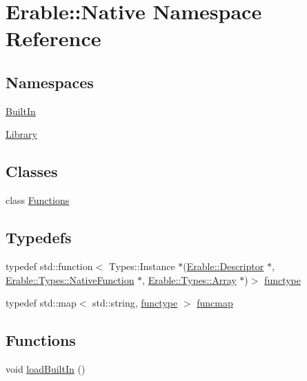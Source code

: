 \hypertarget{namespace_erable_1_1_native}{}\section{Erable\+::Native Namespace Reference}
\label{namespace_erable_1_1_native}
\subsection*{Namespaces}
\begin{DoxyCompactItemize}
\item 
 \mbox{\hyperlink{namespace_erable_1_1_native_1_1_built_in}{Built\+In}}
\item 
 \mbox{\hyperlink{namespace_erable_1_1_native_1_1_library}{Library}}
\end{DoxyCompactItemize}
\subsection*{Classes}
\begin{DoxyCompactItemize}
\item 
class \mbox{\hyperlink{class_erable_1_1_native_1_1_functions}{Functions}}
\end{DoxyCompactItemize}
\subsection*{Typedefs}
\begin{DoxyCompactItemize}
\item 
typedef std\+::function$<$ Types\+::\+Instance $\ast$(\mbox{\hyperlink{class_erable_1_1_descriptor}{Erable\+::\+Descriptor}} $\ast$, \mbox{\hyperlink{class_erable_1_1_erable_1_1_types_1_1_native_function}{Erable\+::\+Types\+::\+Native\+Function}} $\ast$, \mbox{\hyperlink{class_erable_1_1_erable_1_1_types_1_1_array}{Erable\+::\+Types\+::\+Array}} $\ast$)$>$ \mbox{\hyperlink{namespace_erable_1_1_native_ad05719f34b3261ec6ed5ae50fdc188a5}{functype}}
\item 
typedef std\+::map$<$ std\+::string, \mbox{\hyperlink{namespace_erable_1_1_native_ad05719f34b3261ec6ed5ae50fdc188a5}{functype}} $>$ \mbox{\hyperlink{namespace_erable_1_1_native_a6b24cdc21d4331b17b20ec0d3ed9e851}{funcmap}}
\end{DoxyCompactItemize}
\subsection*{Functions}
\begin{DoxyCompactItemize}
\item 
void \mbox{\hyperlink{namespace_erable_1_1_native_a9fe618a87317177880c4bb97af520e2a}{load\+Built\+In}} ()
\end{DoxyCompactItemize}



